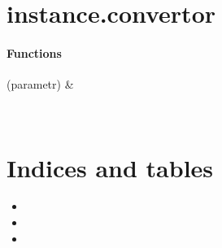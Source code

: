 \documentclass[letterpaper,10pt,russian]{sphinxmanual}
\begin{document}
\sphinxstepscope


\chapter{instance.convertor}
\label{\detokenize{generated/instance.convertor:module-instance.convertor}}\label{\detokenize{generated/instance.convertor:instance-convertor}}\label{\detokenize{generated/instance.convertor::doc}}\subsubsection*{Functions}


\begin{savenotes}\sphinxattablestart
\sphinxthistablewithglobalstyle
\sphinxthistablewithnovlinesstyle
\centering
\begin{tabulary}{\linewidth}[t]{}
\sphinxtoprule
\sphinxtableatstartofbodyhook
\sphinxAtStartPar
{}(parametr)
&
\sphinxAtStartPar

\\
\sphinxbottomrule
\end{tabulary}
\sphinxtableafterendhook\par
\sphinxattableend\end{savenotes}


\chapter{Indices and tables}
\label{\detokenize{index:indices-and-tables}}\begin{itemize}
\item {} 
\sphinxAtStartPar
{}

\item {} 
\sphinxAtStartPar
{}

\item {} 
\sphinxAtStartPar
{}

\end{itemize}


\renewcommand{\indexname}{Содержание модулей Python}
\begin{sphinxtheindex}
\let\bigletter\sphinxstyleindexlettergroup
\bigletter{i}
\item\relax{}
\indexspace
\bigletter{m}
\item\relax{}
\end{sphinxtheindex}

\renewcommand{\indexname}{Алфавитный указатель}
\printindex
\end{document}
